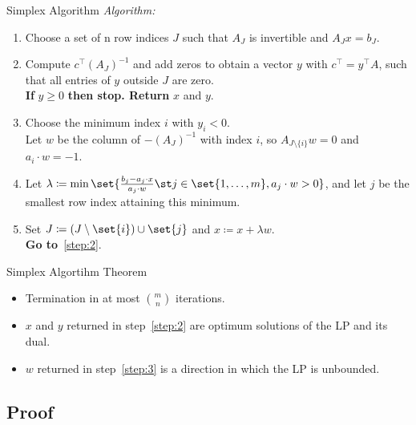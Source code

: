 \documentclass[a4paper, x11names, svgnames]{beamer}
\theoremstyle{definition}
\theoremstyle{plain}
\theoremstyle{plain}
\begin{document}
\begin{frame}{Simplex Algorithm}
    \textit{Algorithm:}
    \begin{enumerate}
        \item \label{step:1}Choose a set of n row indices $J$ such that $A_J$ is invertible and $A_{J}x = b_J$.
        \pause
        \item \label{step:2} Compute $c^\top (A_J)^{-1}$ and add zeros to obtain a vector $y$ with $c^\top = y^\top A$,
        such that all entries of $y$ outside $J$ are zero. \\
        \textbf{If} $y\geq 0$ \textbf{then stop. Return} $x$ and $y$.
        \pause
        \item  \label{step:3}Choose the minimum index $i$ with $y_i < 0$. \\
        Let $w$ be the column of $-(A_J)^{-1}$ with index $i$, so $A_{J\setminus\{i\}}w=0$
        and $a_i \cdot w = -1$.
        \pause
        \item \label{step:4}Let $\lambda \coloneqq \min  \set{\frac{b_j - a_j\cdot x}{a_j\cdot w} \st j\in\set{1,\dots, m}, a_j\cdot w > 0}$,
        and let $j$ be the smallest row index attaining this minimum.
        \pause
        \item \label{step:5} Set $J\coloneqq (J\setminus\set{i})\cup \set{j}$ and $x\coloneqq x + \lambda w$. \\
        \textbf{Go to}~\ref{step:2}.
    \end{enumerate}
\end{frame}

\begin{frame}{Simplex Algortihm Theorem}
    \begin{theorem}
        \begin{itemize}
            \item<1-> Termination in at most $\binom{m}{n}$ iterations.
            \item<2-> $x$ and $y$ returned in step~\ref{step:2} are optimum solutions of the LP and its dual.
            \item<3-> $w$ returned in step~\ref{step:3} is a direction in which the LP is unbounded.
        \end{itemize}
    \end{theorem}
\end{frame}
\subsection{Proof}
\end{document}
